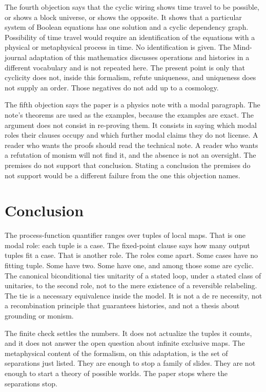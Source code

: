 \documentclass[11pt]{article}
\begin{document}
The fourth objection says that the cyclic wiring shows time travel to be possible, or shows a block universe, or shows the opposite. It shows that a particular system of Boolean equations has one solution and a cyclic dependency graph. Possibility of time travel would require an identification of the equations with a physical or metaphysical process in time. No identification is given. The Mind-journal adaptation of this mathematics discusses operations and histories in a different vocabulary and is not repeated here. The present point is only that cyclicity does not, inside this formalism, refute uniqueness, and uniqueness does not supply an order. Those negatives do not add up to a cosmology.

The fifth objection says the paper is a physics note with a modal paragraph. The note's theorems are used as the examples, because the examples are exact. The argument does not consist in re-proving them. It consists in saying which modal roles their clauses occupy and which further modal claims they do not license. A reader who wants the proofs should read the technical note. A reader who wants a refutation of monism will not find it, and the absence is not an oversight. The premises do not support that conclusion. Stating a conclusion the premises do not support would be a different failure from the one this objection names.

\section{Conclusion}
\label{sec:end}

The process-function quantifier ranges over tuples of local maps. That is one modal role: each tuple is a case. The fixed-point clause says how many output tuples fit a case. That is another role. The roles come apart. Some cases have no fitting tuple. Some have two. Some have one, and among those some are cyclic. The canonical biconditional ties unitarity of a stated loop, under a stated class of unitaries, to the second role, not to the mere existence of a reversible relabeling. The tie is a necessary equivalence inside the model. It is not a de re necessity, not a recombination principle that guarantees histories, and not a thesis about grounding or monism.

The finite check settles the numbers. It does not actualize the tuples it counts, and it does not answer the open question about infinite exclusive maps. The metaphysical content of the formalism, on this adaptation, is the set of separations just listed. They are enough to stop a family of slides. They are not enough to start a theory of possible worlds. The paper stops where the separations stop.
\end{document}

